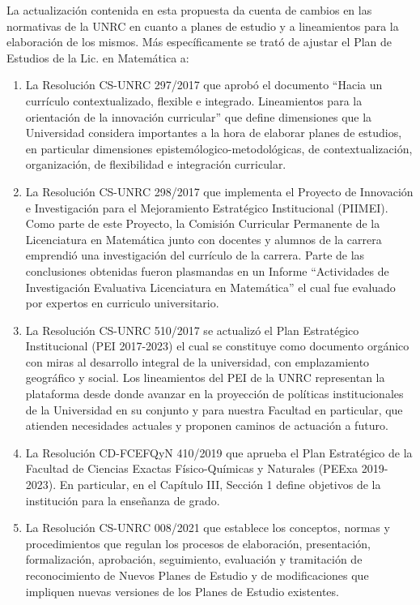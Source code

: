 \documentclass[a4paper, 12pt]{article}
\begin{document}
La actualización  contenida en esta propuesta da cuenta de cambios en las normativas de la UNRC en cuanto a planes de estudio y a lineamientos para la elaboración de los  mismos. Más específicamente se trató de ajustar el Plan de Estudios de la Lic. en Matemática a:



\begin{enumerate}
 \item La Resolución CS-UNRC 297/2017 que aprobó el documento ``Hacia   un   currículo contextualizado, flexible e integrado. Lineamientos para la orientación de la innovación  curricular'' que define dimensiones que la Universidad considera importantes a la hora de elaborar planes de estudios, en particular dimensiones epistemólogico-metodológicas, de contextualización, organización, de flexibilidad e integración curricular. 

 \item La Resolución CS-UNRC 298/2017 que implementa el Proyecto de Innovación e Investigación para el Mejoramiento Estratégico Institucional (PIIMEI). Como parte de este Proyecto, la Comisión Curricular Permanente de la Licenciatura en Matemática junto con docentes y alumnos de la carrera emprendió una investigación del currículo de la carrera.  Parte de las conclusiones obtenidas fueron plasmandas en un Informe ``Actividades de Investigación Evaluativa
Licenciatura en Matemática'' el cual fue evaluado por expertos en curriculo universitario.

\item La Resolución CS-UNRC 510/2017 se actualizó el Plan Estratégico Institucional (PEI 2017-2023) el cual se constituye como documento orgánico con miras al desarrollo integral de la universidad, con emplazamiento geográfico y social. Los lineamientos del PEI de la UNRC representan la plataforma desde donde avanzar en la proyección de políticas institucionales de la Universidad en su conjunto y para nuestra Facultad en particular, que atienden necesidades actuales y proponen caminos de actuación a futuro.

\item La Resolución CD-FCEFQyN 410/2019 que aprueba el Plan Estratégico de la Facultad de Ciencias Exactas Físico-Químicas y Naturales (PEExa 2019-2023). En particular, en el Capítulo III, Sección 1 define objetivos de la institución para la enseñanza de grado.   

 \item La Resolución CS-UNRC 008/2021 que establece los conceptos, normas y procedimientos que regulan los procesos de elaboración, presentación, formalización, aprobación, seguimiento, evaluación y tramitación de reconocimiento de Nuevos Planes de Estudio y de modificaciones que impliquen nuevas versiones de los Planes de Estudio existentes.

\end{enumerate}
\end{document}
